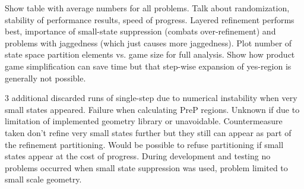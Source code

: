 
    Show table with average numbers for all problems.
    Talk about randomization, stability of performance results, speed of progress.
    Layered refinement performs best, importance of small-state suppression (combats over-refinement) and problems with jaggedness (which just causes more jaggedness).
    Plot number of state space partition elements vs. game size for full analysis.
    Show how product game simplification can save time but that step-wise expansion of yes-region is generally not possible.

    3 additional discarded runs of single-step due to numerical instability when very small states appeared.
    Failure when calculating PreP regions.
    Unknown if due to limitation of implemented geometry library or unavoidable.
    Countermeasure taken don't refine very small states further but they still can appear as part of the refinement partitioning.
    Would be possible to refuse partitioning if small states appear at the cost of progress.
    During development and testing no problems occurred when small state suppression was used, problem limited to small scale geometry.

\stopsubsection

